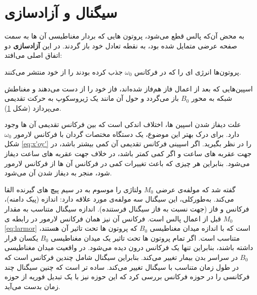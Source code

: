 \section{سیگنال  و آزادسازی}

به محض آن‌که پالس  قطع می‌شود، پروتون هایی که بردار مغناطیسی آن ها به سمت صفحه عرضی متمایل شده بود، به نقطه تعادل خود باز گردند. در این \textbf{آزاد‌سازی} 
دو اتفاق اصلی می‌افتد:
\begin{enuminline}
	\item پروتون‌ها انرژی ای را که در فرکانس $\omega_0$ جذب کرده بودند را از خود منتشر می‌کنند.
	\item اسپین‌هایی که بعد از اعمال فاز هم‌فاز شده‌اند، فاز خود را از دست می‌دهند و مغناطش شبکه به محور $B_0$ باز می‌گردد و حول آن مانند یک ژیروسکوپ به حرکت تقدیمی می‌پردازد (شکل \ref{fig:rotating-axis-coil}).
\end{enuminline}




\begin{figure}
	\centering
	\caption{}
	\label{fig:rotating-axis-coil}
\end{figure}

علت دیفاز شدن اسپین ها، اختلاف اندکی است که بین فرکانس تقدیمی آن ها وجود دارد. برای درک بهتر این موضوع، یک دستگاه مختصات گردان با فرکانس لارمور $\omega_0$ شکل \ref{eq:x'oy'} را در نظر بگیرید. اگر اسپینی فرکانس تقدیمی آن کمی بیشتر باشد، در جهت عقربه های ساعت و اگر کمی کمتر باشد، در خلاف جهت عقربه های ساعت دیفاز می‌شود. بنابراین هر چیزی که باعث تغییرات کمی در فرکانس  آن ها از فرکانس لارمور شود، منجر به دیفاز شدن آن می‌شود. \cite{McRobbie}

گفته شد که مولفه‌ی عرضی $M_0$ ولتاژی را موسوم به  در سیم پیچ های گیرنده القا می‌کند. به‌طور‌کلی، 
این سیگنال  سه مولفه‌ی مورد علاقه دارد: اندازه 
(پیک دامنه‌)، فرکانس و فاز (جهت نسبت به فاز سیگنال  فرستنده).
اندازه سیگنال متناسب به مقدار $M_0$ قبل از اعمال پالس  است. فرکانس آن نیز همان فرکانس لارمور در رابطه ی \ref{eq:larmor} است که با اندازه میدان مغناطیسی $B_0$ که پروتون ها تحت تاثیر آن هستند، متناسب است.
اگر تمام پروتون ها تحت تاثیر یک میدان مغناطیسی $B_0$ یکسان قرار داشته باشند،  بنابراین تنها یک فرکانس درون  دیده می‌شود. در واقعیت میدان مغناطیسی $B_0$ در سراسر بدن بیمار تغییر می‌کند. بنابراین سیگنال 
شامل چندین فرکانس  است که در طول زمان متناسب با سیگنال  تغییر می‌کند. ساده تر است که چنین سیگنال چند فرکانسی را در حوزه فرکانس بررسی کرد که این حوزه نیز با یک تبدیل فوریه 
از حوزه زمان بدست می‌آید.\cite{book:basic-principles-and-applications}



